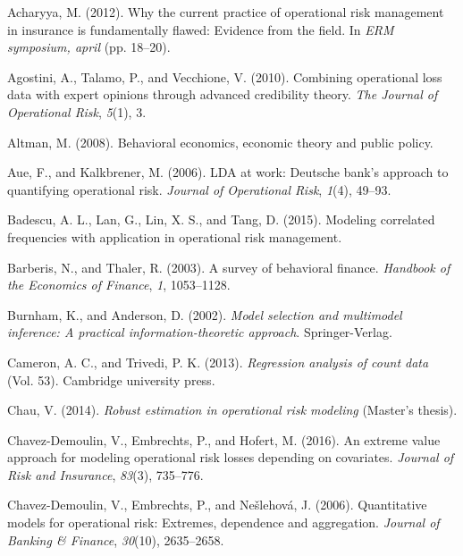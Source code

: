 \documentclass[]{DissertateUSU}
\begin{document}
\setlength{\parindent}{-0.5in} \setlength{\leftskip}{0.4in}
\setlength{\parskip}{6pt} \noindent

\hypertarget{refs}{}
\hypertarget{ref-acharyya2012current}{}
Acharyya, M. (2012). Why the current practice of operational risk
management in insurance is fundamentally flawed: Evidence from the
field. In \emph{ERM symposium, april} (pp. 18--20).

\hypertarget{ref-agostini2010combining}{}
Agostini, A., Talamo, P., and Vecchione, V. (2010). Combining
operational loss data with expert opinions through advanced credibility
theory. \emph{The Journal of Operational Risk}, \emph{5}(1), 3.

\hypertarget{ref-altman2008behavioral}{}
Altman, M. (2008). Behavioral economics, economic theory and public
policy.

\hypertarget{ref-aue2006lda}{}
Aue, F., and Kalkbrener, M. (2006). LDA at work: Deutsche bank's
approach to quantifying operational risk. \emph{Journal of Operational
Risk}, \emph{1}(4), 49--93.

\hypertarget{ref-badescu2015modeling}{}
Badescu, A. L., Lan, G., Lin, X. S., and Tang, D. (2015). Modeling
correlated frequencies with application in operational risk management.

\hypertarget{ref-barberis2003survey}{}
Barberis, N., and Thaler, R. (2003). A survey of behavioral finance.
\emph{Handbook of the Economics of Finance}, \emph{1}, 1053--1128.

\hypertarget{ref-Burnham2002}{}
Burnham, K., and Anderson, D. (2002). \emph{Model selection and
multimodel inference: A practical information-theoretic approach}.
Springer-Verlag.

\hypertarget{ref-cameron2013regression}{}
Cameron, A. C., and Trivedi, P. K. (2013). \emph{Regression analysis of
count data} (Vol. 53). Cambridge university press.

\hypertarget{ref-chau2014robust}{}
Chau, V. (2014). \emph{Robust estimation in operational risk modeling}
(Master's thesis).

\hypertarget{ref-chavez2016extreme}{}
Chavez-Demoulin, V., Embrechts, P., and Hofert, M. (2016). An extreme
value approach for modeling operational risk losses depending on
covariates. \emph{Journal of Risk and Insurance}, \emph{83}(3),
735--776.

\hypertarget{ref-chavez2006quantitative}{}
Chavez-Demoulin, V., Embrechts, P., and Nešlehová, J. (2006).
Quantitative models for operational risk: Extremes, dependence and
aggregation. \emph{Journal of Banking \& Finance}, \emph{30}(10),
2635--2658.
\end{document}
